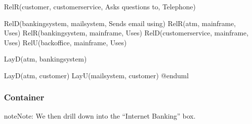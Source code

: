 \documentclass[letterpaper,10pt,english]{sphinxmanual}
\begin{document}
\begin{sphinxVerbatim}[commandchars=\\\{\},numbers=left,firstnumber=1,stepnumber=1]
Rel\PYGZus{}R(customer, customer\PYGZus{}service, \PYGZdq{}Asks questions to\PYGZdq{}, \PYGZdq{}Telephone\PYGZdq{})

Rel\PYGZus{}D(banking\PYGZus{}system, mail\PYGZus{}system, \PYGZdq{}Sends e\PYGZhy{}mail using\PYGZdq{})
Rel\PYGZus{}R(atm, mainframe, \PYGZdq{}Uses\PYGZdq{})
Rel\PYGZus{}R(banking\PYGZus{}system, mainframe, \PYGZdq{}Uses\PYGZdq{})
Rel\PYGZus{}D(customer\PYGZus{}service, mainframe, \PYGZdq{}Uses\PYGZdq{})
Rel\PYGZus{}U(back\PYGZus{}office, mainframe, \PYGZdq{}Uses\PYGZdq{})

Lay\PYGZus{}D(atm, banking\PYGZus{}system)

Lay\PYGZus{}D(atm, customer)
Lay\PYGZus{}U(mail\PYGZus{}system, customer)
@enduml
\end{sphinxVerbatim}


\subsubsection{Container}
\label{\detokenize{C4/C4Stdlib:container}}
\begin{sphinxadmonition}{note}{Note:}
We then drill down into the “Internet Banking” box.
\end{sphinxadmonition}

\begin{figure}[htbp]
\centering

\end{figure}
\end{document}
